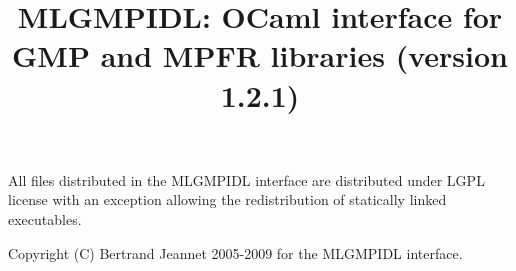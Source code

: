 \documentclass[twoside,10pt,a4paper]{report}
\title{MLGMPIDL: OCaml interface for GMP and MPFR libraries (version 1.2.1)}
\begin{document}
\maketitle

\vspace*{0.9\textheight}

All files distributed in the MLGMPIDL interface are
distributed under LGPL license with an exception allowing 
the redistribution of statically linked executables.

Copyright (C) Bertrand Jeannet 2005-2009 for the MLGMPIDL
interface.

\newpage

\tableofcontents



\appendix
\printindex
\end{document}
